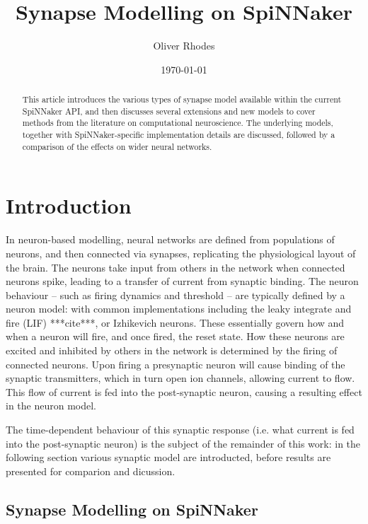 \documentclass[12pt]{article}
\title{Synapse Modelling on SpiNNaker}
\author{Oliver Rhodes}
\date{\today}
\begin{document}
\maketitle

\begin{abstract}
This article introduces the various types of synapse model available within the
current SpiNNaker API, and then discusses several extensions and new models to
cover methods from the literature on computational neuroscience. The underlying
models, together with SpiNNaker-specific implementation details are discussed,
followed by a comparison of the effects on wider neural networks.
\end{abstract}

\section{Introduction}
In neuron-based modelling, neural networks are defined from populations of
neurons, and then connected via synapses, replicating the physiological layout
of the brain. The neurons take input from others in the network when connected
neurons spike, leading to a transfer of current from synaptic binding. The
neuron behaviour -- such as firing dynamics and threshold -- are typically
defined by a neuron model: with common implementations including the leaky
integrate and fire (LIF) ***cite***, or Izhikevich
\cite{SimpleModelofSpikingNeurons} neurons. These essentially govern how and
when a neuron will fire, and once fired, the reset state. How these neurons are
excited and inhibited by others in the network is determined by the firing of
connected neurons. Upon firing a presynaptic neuron will cause binding of the
synaptic transmitters, which in turn open ion channels, allowing current to
flow. This flow of current is fed into the post-synaptic neuron, causing a
resulting effect in the neuron model.

The time-dependent behaviour of this synaptic response (i.e. what current
is fed into the post-synaptic neuron) is the subject of the remainder of this
work: in the following section various synaptic model are introducted, before
results are presented for comparion and dicussion.

\subsection*{Synapse Modelling on SpiNNaker}
\end{document}

